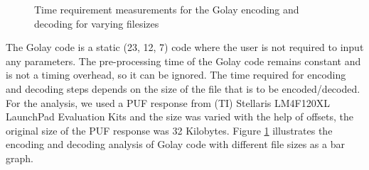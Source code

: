 \begin{figure}[h]
\centering
{}
\caption{Time requirement measurements for the Golay encoding and decoding for varying filesizes}
\label{img:golay_time}
\end{figure}
The Golay code is a static (23, 12, 7) code where the user is not required to input any parameters. The pre-processing time of the Golay code remains constant and is not a timing overhead, so it can be ignored. The time required for encoding and decoding steps depends on the size of the file that is to be encoded/decoded. For the analysis, we used a PUF response from (TI) Stellaris LM4F120XL LaunchPad Evaluation Kits and the size was varied with the help of offsets, the original size of
the PUF response was 32 Kilobytes. Figure \ref{img:golay_time} illustrates the encoding and decoding analysis of Golay code with different file sizes as a bar graph.\\
